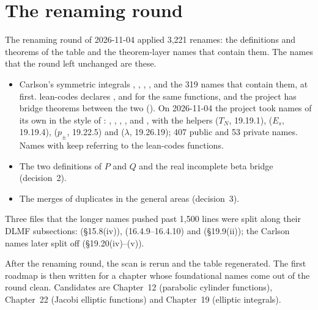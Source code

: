 \documentclass[11pt,a4paper]{article}
\begin{document}
\section{The renaming round}

The renaming round of 2026-11-04 applied 3,221 renames: the definitions and theorems of the
table and the theorem-layer names that contain them. The names that the round left unchanged are
these.
\begin{itemize}
  \item Carlson's symmetric integrals , , , ,
     and the 319 names that contain them, at first. lean-codes declares
    ,  and
     for the same functions, and the project has bridge
    theorems between the two (). On 2026-11-04 the project
    took names of its own in the style of : ,
    , , ,  and , with the
    helpers  ($T_N$, 19.19.1),
     ($E_s$, 19.19.4),  ($p_\pm$,
    19.22.5) and  ($\lambda$, 19.26.19); 407 public and 53 private
    names. Names with  keep referring to the lean-codes functions.
  \item The two definitions of $P$ and $Q$ and the real incomplete beta bridge (decision~2).
  \item The merges of duplicates in the general areas (decision~3).
\end{itemize}
Three files that the longer names pushed past 1,500 lines were split along their DLMF
subsections:  (\S15.8(iv)),
 (16.4.9--16.4.10) and
 (\S19.9(ii)); the Carlson names later
split off  (\S19.20(iv)--(v)).

After the renaming round, the scan is rerun and the table regenerated. The first roadmap
is then written for a chapter whose foundational names come out of the round clean.
Candidates are Chapter~12 (parabolic cylinder functions), Chapter~22 (Jacobi elliptic
functions) and Chapter~19 (elliptic integrals).
\end{document}
